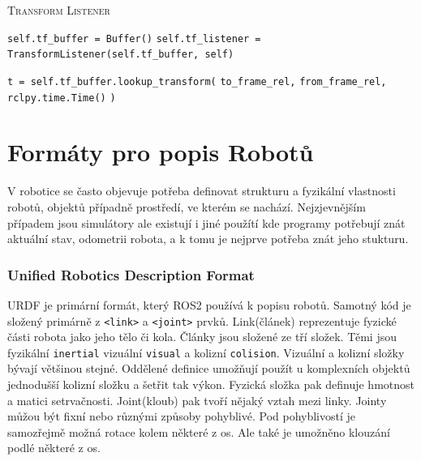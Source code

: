 \begin{algorithm}[h!]
	\label{}
	\caption{\textsc{Transform Listener}}
	
	\DontPrintSemicolon
	\SetAlgoNoLine
	\SetNlSty{}{}{:}
	\SetNlSkip{-1.1em}
	
	\BlankLine \Indp\Indpp
	
	\texttt{self.tf\_buffer = Buffer()}\;
	\texttt{self.tf\_listener = TransformListener(self.tf\_buffer, self)}\;

	\BlankLine
	\texttt{t = self.tf\_buffer.lookup\_transform(}\;
	\Indp\Indp
	\texttt{to\_frame\_rel,}\;
	\texttt{from\_frame\_rel,}\;
	\texttt{rclpy.time.Time()}\;
	\Indm\Indm
	\texttt{)}\;
	
\end{algorithm}

\section{Formáty pro popis Robotů}
V robotice se často objevuje potřeba definovat strukturu a fyzikální vlastnosti robotů, objektů případně prostředí, ve kterém se nachází. Nejzjevnějším případem jsou simulátory ale existují i jiné použítí kde programy potřebují znát aktuální stav, odometrii robota, a k tomu je nejprve potřeba znát jeho stukturu.

\subsubsection*{Unified Robotics Description Format}
URDF je primární formát, který ROS2 používá k popisu robotů. Samotný kód je složený primárně z \verb|<link>| a \verb|<joint>| prvků. Link(článek) reprezentuje fyzické části robota jako jeho tělo či kola. Články jsou složené ze tří složek. Těmi jsou fyzikální \verb|inertial| vizuální \verb|visual| a kolizní \verb|colision|. Vizuální a kolizní složky bývají většinou stejné. Oddělené definice umožňují použít u komplexních objektů jednodušší kolizní složku a šetřit tak výkon. Fyzická složka pak definuje hmotnost a matici setrvačnosti. Joint(kloub) pak tvoří nějaký vztah mezi linky. Jointy můžou být fixní nebo různými způsoby pohyblivé. Pod pohyblivostí je samozřejmě možná rotace kolem některé z os. Ale také je umožněno klouzání podlé některé z os.


